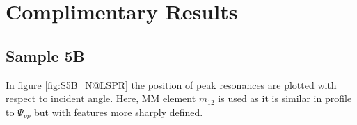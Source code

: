 \appendix

\chapter{Complimentary Results}
\label{sec:AppendixA}


\section{Sample 5B}
In figure \ref{fig:S5B_N@LSPR} the position of peak resonances are plotted with respect to incident angle. Here, MM element $m_{12}$ is used as it is similar in profile to $\Psi_{pp}$ but with features more sharply defined.

